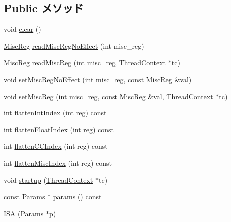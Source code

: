 \subsection*{Public メソッド}
\begin{DoxyCompactItemize}
\item 
void \hyperlink{classPowerISA_1_1ISA_ac8bb3912a3ce86b15842e79d0b421204}{clear} ()
\item 
\hyperlink{namespacePowerISA_aa16539aa6584fd12f7d6fa868f75b4de}{MiscReg} \hyperlink{classPowerISA_1_1ISA_a7b5ac6af9c2c19d7c1b442b8a3aebbc6}{readMiscRegNoEffect} (int misc\_\-reg)
\item 
\hyperlink{namespacePowerISA_aa16539aa6584fd12f7d6fa868f75b4de}{MiscReg} \hyperlink{classPowerISA_1_1ISA_a5e47db3953e6f623b58fee4f22a406bd}{readMiscReg} (int misc\_\-reg, \hyperlink{classThreadContext}{ThreadContext} $\ast$tc)
\item 
void \hyperlink{classPowerISA_1_1ISA_a763517aaea2f3decbc1ef9d064216b6f}{setMiscRegNoEffect} (int misc\_\-reg, const \hyperlink{namespacePowerISA_aa16539aa6584fd12f7d6fa868f75b4de}{MiscReg} \&val)
\item 
void \hyperlink{classPowerISA_1_1ISA_ae4d63c6d4ee4354d39674ff8c53d9e2f}{setMiscReg} (int misc\_\-reg, const \hyperlink{namespacePowerISA_aa16539aa6584fd12f7d6fa868f75b4de}{MiscReg} \&val, \hyperlink{classThreadContext}{ThreadContext} $\ast$tc)
\item 
int \hyperlink{classPowerISA_1_1ISA_aece4b88ffcab608652e8e9f0fbe643d4}{flattenIntIndex} (int reg) const 
\item 
int \hyperlink{classPowerISA_1_1ISA_a85addcd4f57c5a0ffa81805dcad1eeb7}{flattenFloatIndex} (int reg) const 
\item 
int \hyperlink{classPowerISA_1_1ISA_a7a5d7476bd10e5af09e6e753d1fca087}{flattenCCIndex} (int reg) const 
\item 
int \hyperlink{classPowerISA_1_1ISA_a8997760aa4425793911f57440a4dd8ae}{flattenMiscIndex} (int reg) const 
\item 
void \hyperlink{classPowerISA_1_1ISA_a769e733729615c529fdb54f538f11dba}{startup} (\hyperlink{classThreadContext}{ThreadContext} $\ast$tc)
\item 
const \hyperlink{classPowerISA_1_1ISA_aa026c2a3d58faf0c2fdd7af027f1cf55}{Params} $\ast$ \hyperlink{classPowerISA_1_1ISA_af2c956efac72df6a2cb0157aa356e70f}{params} () const 
\item 
\hyperlink{classPowerISA_1_1ISA_ae9132e021b3f3b20c917fc328a056bbd}{ISA} (\hyperlink{classPowerISA_1_1ISA_aa026c2a3d58faf0c2fdd7af027f1cf55}{Params} $\ast$p)
\end{DoxyCompactItemize}
